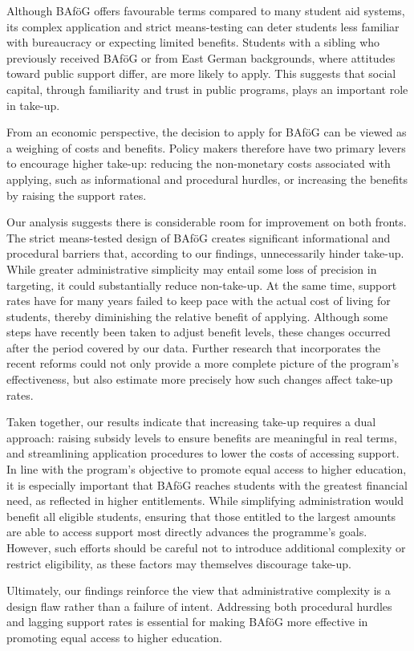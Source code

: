 Although BAföG offers favourable terms compared to many student aid systems, its complex application and strict means-testing can deter students less familiar with bureaucracy or expecting limited benefits.
Students with a sibling who previously received BAföG or from East German backgrounds, where attitudes toward public support differ, are more likely to apply.
This suggests that social capital, through familiarity and trust in public programs, plays an important role in take-up.

From an economic perspective, the decision to apply for BAföG can be viewed as a weighing of costs and benefits. 
Policy makers therefore have two primary levers to encourage higher take-up: reducing the non-monetary costs associated with applying, such as informational and procedural hurdles, or increasing the benefits by raising the support rates. 

Our analysis suggests there is considerable room for improvement on both fronts. 
The strict means-tested design of BAföG creates significant informational and procedural barriers that, according to our findings, unnecessarily hinder take-up.
While greater administrative simplicity may entail some loss of precision in targeting, it could substantially reduce non-take-up. 
At the same time, support rates have for many years failed to keep pace with the actual cost of living for students, thereby diminishing the relative benefit of applying. 
Although some steps have recently been taken to adjust benefit levels, these changes occurred after the period covered by our data. 
Further research that incorporates the recent reforms could not only provide a more complete picture of the program’s effectiveness, but also estimate more precisely how such changes affect take-up rates.

Taken together, our results indicate that increasing take-up requires a dual approach: raising subsidy levels to ensure benefits are meaningful in real terms, and streamlining application procedures to lower the costs of accessing support. In line with the program's objective to promote equal access to higher education, it is especially important that BAföG reaches students with the greatest financial need, as reflected in higher entitlements. While simplifying administration would benefit all eligible students, ensuring that those entitled to the largest amounts are able to access support most directly advances the programme’s goals. However, such efforts should be careful not to introduce additional complexity or restrict eligibility, as these factors may themselves discourage take-up.

 Ultimately, our findings reinforce the view that administrative complexity is a design flaw rather than a failure of intent. Addressing both procedural hurdles and lagging support rates is essential for making BAföG more effective in promoting equal access to higher education.

